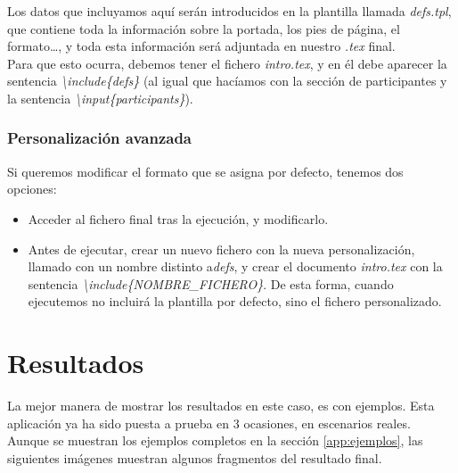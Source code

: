 \documentclass[a4paper, 12pt]{book}
\begin{document}
Los datos que incluyamos aquí serán introducidos en la plantilla llamada \textit{defs.tpl}, que contiene toda la información sobre la portada, los pies de página, el formato\ldots, y toda esta información será adjuntada en nuestro \textit{.tex} final.\\

Para que esto ocurra, debemos tener el fichero \textit{intro.tex}, y en él debe aparecer la sentencia \textit{\textbackslash include\{defs\}} (al igual que hacíamos con la sección de participantes y la sentencia \mbox{\textit{\textbackslash input\{participants\}}}).

\subsection{Personalización avanzada}
Si queremos modificar el formato que se asigna por defecto, tenemos dos opciones:
\begin{itemize}
	\item Acceder al fichero final tras la ejecución, y modificarlo.
	\item Antes de ejecutar, crear un nuevo fichero con la nueva personalización, llamado con un nombre distinto a\textit{defs}, y crear el documento \textit{intro.tex} con la sentencia \textit{\textbackslash include\{NOMBRE\_FICHERO\}}. De esta forma, cuando ejecutemos no incluirá la plantilla por defecto, sino el fichero personalizado.
\end{itemize}






\cleardoublepage
\chapter{Resultados}
\label{chap:resultados}
La mejor manera de mostrar los resultados en este caso, es con ejemplos. Esta aplicación ya ha sido puesta a prueba en 3 ocasiones, en escenarios reales.\\

Aunque se muestran los ejemplos completos en la sección \ref{app:ejemplos}, las siguientes imágenes muestran algunos fragmentos del resultado final.\\
\end{document}
